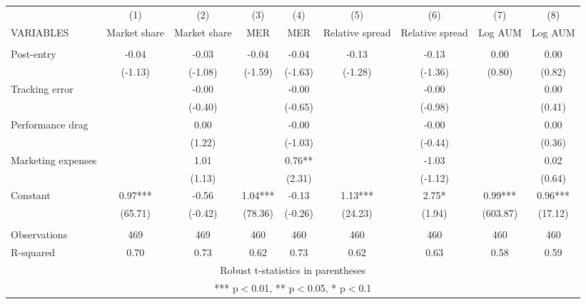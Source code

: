 \documentclass[]{article}
\begin{document}
\begin{tabular}{lcccccccc} \hline
 & (1) & (2) & (3) & (4) & (5) & (6) & (7) & (8) \\
VARIABLES & Market share & Market share & MER & MER & Relative spread & Relative spread & Log AUM & Log AUM \\ \hline
 &  &  &  &  &  &  &  &  \\
Post-entry & -0.04 & -0.03 & -0.04 & -0.04 & -0.13 & -0.13 & 0.00 & 0.00 \\
 & (-1.13) & (-1.08) & (-1.59) & (-1.63) & (-1.28) & (-1.36) & (0.80) & (0.82) \\
Tracking error &  & -0.00 &  & -0.00 &  & -0.00 &  & 0.00 \\
 &  & (-0.40) &  & (-0.65) &  & (-0.98) &  & (0.41) \\
Performance drag &  & 0.00 &  & -0.00 &  & -0.00 &  & 0.00 \\
 &  & (1.22) &  & (-1.03) &  & (-0.44) &  & (0.36) \\
Marketing expenses &  & 1.01 &  & 0.76** &  & -1.03 &  & 0.02 \\
 &  & (1.13) &  & (2.31) &  & (-1.12) &  & (0.64) \\
Constant & 0.97*** & -0.56 & 1.04*** & -0.13 & 1.13*** & 2.75* & 0.99*** & 0.96*** \\
 & (65.71) & (-0.42) & (78.36) & (-0.26) & (24.23) & (1.94) & (603.87) & (17.12) \\
 &  &  &  &  &  &  &  &  \\
Observations & 469 & 469 & 460 & 460 & 460 & 460 & 460 & 460 \\
 R-squared & 0.70 & 0.73 & 0.62 & 0.73 & 0.62 & 0.63 & 0.58 & 0.59 \\ \hline
\multicolumn{9}{c}{ Robust t-statistics in parentheses} \\
\multicolumn{9}{c}{ *** p$<$0.01, ** p$<$0.05, * p$<$0.1} \\
\end{tabular}
\end{document}

